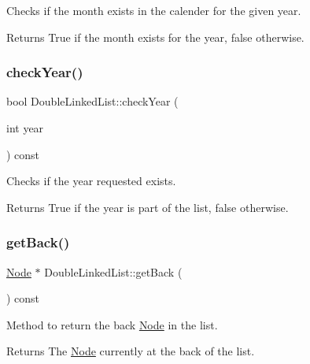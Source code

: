 Checks if the month exists in the calender for the given year. 

\begin{DoxyReturn}{Returns}
True if the month exists for the year, false otherwise. 
\end{DoxyReturn}
\hypertarget{class_double_linked_list_a9d07d8d5b62ee69959b76667e83642ac}{}\label{class_double_linked_list_a9d07d8d5b62ee69959b76667e83642ac} 
\subsubsection{\texorpdfstring{check\+Year()}{checkYear()}}
{\footnotesize\ttfamily bool Double\+Linked\+List\+::check\+Year (\begin{DoxyParamCaption}\item[{int}]{year }\end{DoxyParamCaption}) const}



Checks if the year requested exists. 

\begin{DoxyReturn}{Returns}
True if the year is part of the list, false otherwise. 
\end{DoxyReturn}
\hypertarget{class_double_linked_list_a0b03a5a7cbdf78a0bcc6fce02e97d895}{}\label{class_double_linked_list_a0b03a5a7cbdf78a0bcc6fce02e97d895} 
\subsubsection{\texorpdfstring{get\+Back()}{getBack()}}
{\footnotesize\ttfamily \hyperlink{class_node}{Node} $\ast$ Double\+Linked\+List\+::get\+Back (\begin{DoxyParamCaption}{ }\end{DoxyParamCaption}) const}



Method to return the back \hyperlink{class_node}{Node} in the list. 

\begin{DoxyReturn}{Returns}
The \hyperlink{class_node}{Node} currently at the back of the list. 
\end{DoxyReturn}
\hypertarget{class_double_linked_list_a9f32e3a5518aaddc4d16639d0d07726c}{}\label{class_double_linked_list_a9f32e3a5518aaddc4d16639d0d07726c} 
